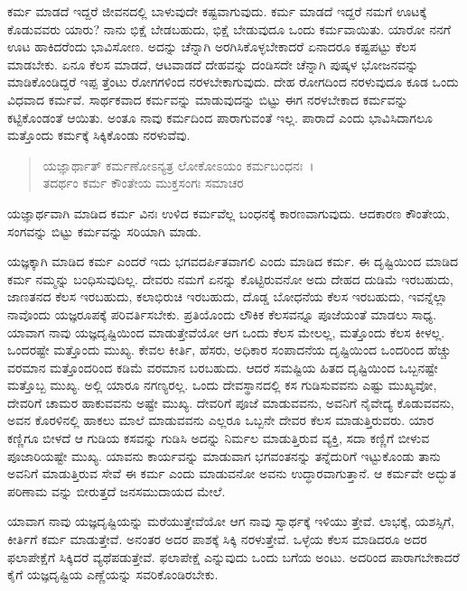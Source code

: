 ಕರ್ಮ ಮಾಡದೆ ಇದ್ದರೆ ಜೀವನದಲ್ಲಿ ಬಾಳುವುದೇ ಕಷ್ಟವಾಗುವುದು. ಕರ್ಮ ಮಾಡದೆ ಇದ್ದರೆ ನಮಗೆ ಊಟಕ್ಕೆ ಕೊಡುವವರು ಯಾರು? ನಾನು ಭಿಕ್ಷೆ ಬೇಡಬಹುದು, ಭಿಕ್ಷೆ ಬೇಡುವುದೂ ಒಂದು ಕರ್ಮವಾಯಿತು. ಯಾರೋ ನನಗೆ ಊಟ ಹಾಕಿದರೆಂದು ಭಾವಿಸೋಣ. ಅದನ್ನು ಚೆನ್ನಾಗಿ ಅರಗಿಸಿಕೊಳ್ಳಬೇಕಾದರೆ ಏನಾದರೂ ಕಷ್ಟಪಟ್ಟು ಕೆಲಸ ಮಾಡಬೇಕು. ಏನೂ ಕೆಲಸ ಮಾಡದೆ, ಆಟವಾಡದೆ ದೇಹವನ್ನು ದಂಡಿಸದೇ ಚೆನ್ನಾಗಿ ಪುಷ್ಕಳ ಭೋಜನವನ್ನು ಮಾಡಿಕೊಂಡಿದ್ದರೆ ಇಪ್ಪ ತ್ತೆಂಟು ರೋಗಗಳಿಂದ ನರಳಬೇಕಾಗುವುದು. ದೇಹ ರೋಗದಿಂದ ನರಳುವುದೂ ಕೂಡ ಒಂದು ವಿಧವಾದ ಕರ್ಮವೆ. ಸಾರ್ಥಕವಾದ ಕರ್ಮವನ್ನು ಮಾಡುವುದನ್ನು ಬಿಟ್ಟು ಈಗ ನರಳಬೇಕಾದ ಕರ್ಮವನ್ನು ಕಟ್ಟಿಕೊಂಡಂತೆ ಆಯಿತು. ಅಂತೂ ನಾವು ಕರ್ಮದಿಂದ ಪಾರಾಗುವಂತೆ ಇಲ್ಲ. ಪಾರಾದೆ ಎಂದು ಭಾವಿಸಿದಾಗಲೂ ಮತ್ತೊಂದು ಕರ್ಮಕ್ಕೆ ಸಿಕ್ಕಿಕೊಂಡು ನರಳುವೆವು.

\begin{verse}
ಯಜ್ಞಾರ್ಥಾತ್ ಕರ್ಮಣೋಽನ್ಯತ್ರ ಲೋಕೋಽಯಂ ಕರ್ಮಬಂಧನಃ~।\\ತದರ್ಥಂ ಕರ್ಮ ಕೌಂತೇಯ ಮುಕ್ತಸಂಗಃ ಸಮಾಚರ 
\end{verse}

{\small ಯಜ್ಞಾರ್ಥವಾಗಿ ಮಾಡಿದ ಕರ್ಮ ವಿನಃ ಉಳಿದ ಕರ್ಮವೆಲ್ಲ ಬಂಧನಕ್ಕೆ ಕಾರಣವಾಗುವುದು. ಆದಕಾರಣ ಕೌಂತೇಯ, ಸಂಗವನ್ನು ಬಿಟ್ಟು ಕರ್ಮವನ್ನು ಸರಿಯಾಗಿ ಮಾಡು.}

ಯಜ್ಞಕ್ಕಾಗಿ ಮಾಡಿದ ಕರ್ಮ ಎಂದರೆ ಇದು ಭಗವದರ್ಪಿತವಾಗಲಿ ಎಂದು ಮಾಡಿದ ಕರ್ಮ. ಈ ದೃಷ್ಟಿಯಿಂದ ಮಾಡಿದ ಕರ್ಮ ನಮ್ಮನ್ನು ಬಂಧಿಸುವುದಿಲ್ಲ. ದೇವರು ನಮಗೆ ಏನನ್ನು ಕೊಟ್ಟಿರುವನೋ ಅದು ದೇಹದ ದುಡಿಮೆ ಇರಬಹುದು, ಜಾಣತನದ ಕೆಲಸ ಇರಬಹುದು, ಕಲಾಭಿರುಚಿ ಇರಬಹುದು, ದೊಡ್ಡ ಬೋಧನೆಯ ಕೆಲಸ ಇರಬಹುದು, ಇವನ್ನೆಲ್ಲಾ ನಾವೊಂದು ಯಜ್ಞರೂಪಕ್ಕೆ ಪರಿವರ್ತಿಸಬೇಕು. ಪ್ರತಿಯೊಂದು ಲೌಕಿಕ ಕೆಲಸವನ್ನೂ ಪೂಜೆಯಂತೆ ಮಾಡಲು ಸಾಧ್ಯ. ಯಾವಾಗ ನಾವು ಯಜ್ಞದೃಷ್ಟಿಯಿಂದ ಮಾಡುತ್ತೇವೆಯೋ ಆಗ ಒಂದು ಕೆಲಸ ಮೇಲಲ್ಲ, ಮತ್ತೊಂದು ಕೆಲಸ ಕೀಳಲ್ಲ. ಒಂದರಷ್ಟೇ ಮತ್ತೊಂದು ಮುಖ್ಯ. ಕೇವಲ ಕೀರ್ತಿ, ಹೆಸರು, ಅಧಿಕಾರ ಸಂಪಾದನೆಯ ದೃಷ್ಟಿಯಿಂದ ಒಂದರಿಂದ ಹೆಚ್ಚು ವರಮಾನ ಮತ್ತೊಂದರಿಂದ ಕಡಿಮೆ ವರಮಾನ ಬರಬಹುದು. ಆದರೆ ಸಮಷ್ಟಿಯ ಹಿತದ ದೃಷ್ಟಿಯಿಂದ ಒಬ್ಬನಷ್ಟೇ ಮತ್ತೊಬ್ಬ ಮುಖ್ಯ. ಅಲ್ಲಿ ಯಾರೂ ನಗಣ್ಯರಲ್ಲ. ಒಂದು ದೇವಸ್ಥಾನದಲ್ಲಿ ಕಸ ಗುಡಿಸುವವನು ಎಷ್ಟು ಮುಖ್ಯವೋ, ದೇವರಿಗೆ ಚಾಮರ ಹಾಕುವವನು ಅಷ್ಟೇ ಮುಖ್ಯ. ದೇವರಿಗೆ ಪೂಜೆ ಮಾಡುವವನು, ಅವನಿಗೆ ನೈವೇದ್ಯ ಕೊಡುವವನು, ಅವನ ಕೊರಳಿನಲ್ಲಿ ಹಾಕಲು ಮಾಲೆ ಮಾಡುವವನು ಎಲ್ಲರೂ ಒಬ್ಬನೇ ದೇವರ ಕೆಲಸ ಮಾಡುತ್ತಿರುವರು. ಯಾರ ಕಣ್ಣಿಗೂ ಬೀಳದೆ ಆ ಗುಡಿಯ ಕಸವನ್ನು ಗುಡಿಸಿ ಅದನ್ನು ನಿರ್ಮಲ ಮಾಡುತ್ತಿರುವ ವ್ಯಕ್ತಿ, ಸದಾ ಕಣ್ಣಿಗೆ ಬೀಳುವ ಪೂಜಾರಿಯಷ್ಟೇ ಮುಖ್ಯ. ಯಾವನು ಕಾರ್ಯವನ್ನು ಮಾಡುವಾಗ ಭಗವಂತನನ್ನು ತನ್ನೆದುರಿಗೆ ಇಟ್ಟುಕೊಂಡು ತಾನು ಅವನಿಗೆ ಮಾಡುತ್ತಿರುವ ಸೇವೆ ಈ ಕರ್ಮ ಎಂದು ಮಾಡುವನೋ ಅವನು ಉದ್ಧಾರವಾಗುತ್ತಾನೆ. ಆ ಕರ್ಮವೇ ಅದ್ಭುತ ಪರಿಣಾಮ ವನ್ನು ಬೀರುತ್ತದೆ ಜನಸಮುದಾಯದ ಮೇಲೆ.

ಯಾವಾಗ ನಾವು ಯಜ್ಞದೃಷ್ಟಿಯನ್ನು ಮರೆಯುತ್ತೇವೆಯೋ ಆಗ ನಾವು ಸ್ವಾರ್ಥಕ್ಕೆ ಇಳಿಯು ತ್ತೇವೆ. ಲಾಭಕ್ಕೆ, ಯಶಸ್ಸಿಗೆ, ಕೀರ್ತಿಗೆ ಕರ್ಮ ಮಾಡುತ್ತೇವೆ. ಅನಂತರ ಅದರ ಪಾಶಕ್ಕೆ ಸಿಕ್ಕಿ ನರಳುತ್ತೇವೆ. ಒಳ್ಳೆಯ ಕೆಲಸ ಮಾಡಿದರೂ ಅದರ ಫಲಾಪೇಕ್ಷೆಗೆ ಸಿಕ್ಕಿದರೆ ವ್ಯಥೆಪಡುತ್ತೇವೆ. ಫಲಾಪೇಕ್ಷೆ ಎನ್ನುವುದು ಒಂದು ಬಗೆಯ ಅಂಟು. ಅದರಿಂದ ಪಾರಾಗಬೇಕಾದರೆ ಕೈಗೆ ಯಜ್ಞದೃಷ್ಟಿಯ ಎಣ್ಣೆಯನ್ನು ಸವರಿಕೊಂಡಿರಬೇಕು.


